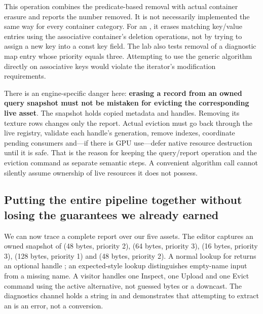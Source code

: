 This operation combines the predicate-based removal with actual container erasure and reports the number removed. It is not necessarily implemented the same way for every container category. For an , it erases matching key/value entries using the associative container's deletion operations, not by trying to assign a new key into a const key field. The lab also tests removal of a diagnostic map entry whose priority equals three. Attempting to use the generic  algorithm directly on associative keys would violate the iterator's modification requirements.

There is an engine-specific danger here: \textbf{erasing a record from an owned query snapshot must not be mistaken for evicting the corresponding live asset}. The snapshot holds copied metadata and handles. Removing its texture rows changes only the report. Actual eviction must go back through the live registry, validate each handle's generation, remove indexes, coordinate pending consumers and---if there is GPU use---defer native resource destruction until it is safe. That is the reason for keeping the query/report operation and the eviction command as separate semantic steps. A convenient algorithm call cannot silently assume ownership of live resources it does not possess.

\subsection{Putting the entire pipeline together without losing the guarantees we already earned}\label{05-engine-i-ch006-putting-the-entire-pipeline-together-without-losing-the-guarantees-we-already-earned}

\hypertarget{05-engine-i-ch006-putting-the-entire-pipeline-together-without-losing-the-guarantees-we-already-earned}{}

We can now trace a complete report over our five assets. The editor captures an owned snapshot of  (48 bytes, priority 2),  (64 bytes, priority 3),  (16 bytes, priority 3),  (128 bytes, priority 1) and  (48 bytes, priority 2). A normal lookup for  returns an optional handle ; an expected-style lookup distinguishes empty-name input from a missing name. A visitor handles one Inspect, one Upload and one Evict command using the active  alternative, not guessed bytes or a downcast. The diagnostics channel holds a string in  and demonstrates that attempting to extract an  is an error, not a conversion.

